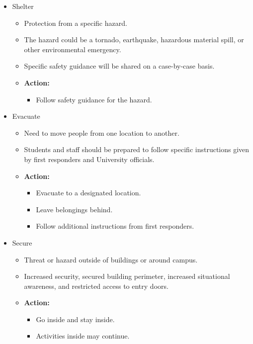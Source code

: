 \documentclass[12pt,letterpaper]{article}
\begin{document}
\begin{itemize}
    \item Shelter
    \begin{itemize}
        \item Protection from a specific hazard.
        \item The hazard could be a tornado, earthquake, hazardous material spill, or other environmental emergency.
        \item Specific safety guidance will be shared on a case-by-case basis.
        \item \textbf{Action:}
        \begin{itemize}
            \item Follow safety guidance for the hazard.
        \end{itemize}
    \end{itemize}
    \item Evacuate
    \begin{itemize}
        \item Need to move people from one location to another.
        \item Students and staff should be prepared to follow specific instructions given by first responders and University officials.
        \item \textbf{Action:}
        \begin{itemize}
            \item Evacuate to a designated location.
            \item Leave belongings behind.
            \item Follow additional instructions from first responders.
        \end{itemize}
    \end{itemize}
    \item Secure
    \begin{itemize}
        \item Threat or hazard outside of buildings or around campus.
        \item Increased security, secured building perimeter, increased situational awareness, and restricted access to entry doors.
        \item \textbf{Action:}
        \begin{itemize}
            \item Go inside and stay inside.
            \item Activities inside may continue.
        \end{itemize}

\end{itemize}
\end{itemize}
\end{document}
